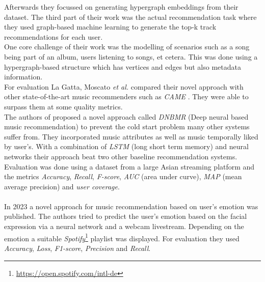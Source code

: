 \documentclass[runningheads,a4paper]{llncs}
\begin{document}
Afterwards they focussed on generating hypergraph embeddings from their dataset.
The third part of their work was the actual recommendation task where they used graph-based machine learning to 
generate the top-k track recommendations for each user. \\
One core challenge of their work was the modelling of scenarios such as a song being part of an album, users listening to songs, et cetera.
This was done using a hypergraph-based structure which has vertices and edges but also metadata information.\\
For evaluation La Gatta, Moscato \textit{et al.} compared their novel approach with other state-of-the-art music recommenders such as \textit{CAME} \cite{wang2020came}.
They were able to surpass them at some quality metrics. \cite{la2022music}
\\
The authors of 
\cite{singh2022novel} proposed a novel approach called \textit{DNBMR} (Deep neural based music recommendation) 
to prevent the cold start problem many other systems suffer from. 
They incorporated music attributes as well as music temporally liked by user's.
With a combination of \textit{LSTM} (long short term memory) and neural networks their approach beat two other baseline recommendation systems.
Evaluation was done using a dataset from a large Asian streaming platform and the metrics \textit{Accuracy}, \textit{Recall}, \textit{F-score},
\textit{AUC} (area under curve), \textit{MAP} (mean average precision) and \textit{user coverage}.\\
\\
In 2023 a novel approach for music recommendation based on user's emotion was published. 
The authors tried to predict the user's emotion based on the facial expression via a neural network and a webcam livestream.
Depending on the emotion a suitable \textit{Spotify}\footnote{\url{https://open.spotify.com/intl-de}} playlist was displayed.
For evaluation they used \textit{Accuracy}, \textit{Loss}, \textit{F1-score}, \textit{Precision} and \textit{Recall}.\cite{priyanka2023novel}
\end{document}
